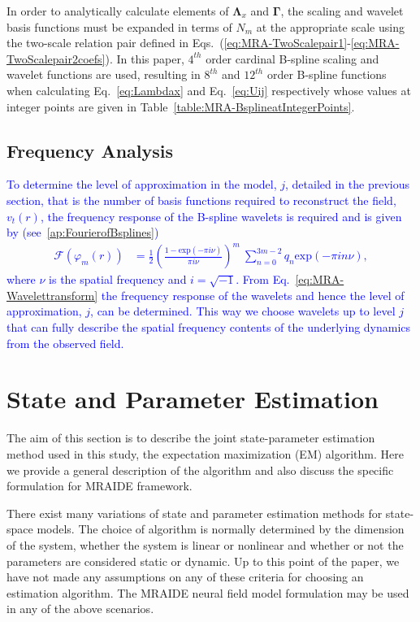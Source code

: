 \documentclass[review,authoryear,3p]{elsarticle}
\newcommand{\parham}[1]{\textcolor{blue}{#1}}
\begin{document}
In order to analytically calculate elements of $\boldsymbol\Lambda_{x}$ and $\boldsymbol\Gamma$, the scaling and wavelet basis functions must be expanded in terms of $N_m$ at the appropriate scale using the two-scale relation pair defined in Eqs.~(\eqref{eq:MRA-TwoScalepair1}-\eqref{eq:MRA-TwoScalepair2coefs}). 
In this paper, $4^{th}$ order cardinal B-spline scaling and wavelet functions are used, resulting in  $8^{th}$ and $12^{th}$ order B-spline functions when calculating Eq.~\eqref{eq:Lambdax} and Eq.~\eqref{eq:Uij} respectively  whose values at integer points are given in Table~\ref{table:MRA-BsplineatIntegerPoints}.
\subsection{Frequency Analysis}\label{sec:freq_anal}
\parham{To determine the level of approximation in the model, $j$, detailed in the previous section, that is the number of basis functions required to reconstruct the field, $v_t(r)$, the frequency response of the B-spline wavelets is required and is given by (see~\ref{ap:FourierofBsplines}) 
\begin{align}      
	  \mathcal{F}(\varphi_{m}\left(r\right)) &=\frac{1}{2}\left(\frac{1-\mathrm{exp}(-\pi i \nu)}{\pi i\nu}\right)^m~\sum_{n=0}^{3m-2}  q_n \mathrm{exp}(-\pi in\nu),\label{eq:MRA-Wavelettransform}
\end{align}
where $\nu$ is the spatial frequency and $i=\sqrt{-1}$. From Eq.~\eqref{eq:MRA-Wavelettransform} the frequency response of the wavelets and hence the level of approximation, $j$, can be determined. This way we choose wavelets up to level $j$ that can fully describe the spatial frequency contents of the underlying dynamics from the observed field.}
\section{State and Parameter Estimation}
The aim of this section is to describe the joint state-parameter estimation method used in this study, the expectation maximization (EM) algorithm. Here we provide a general description of the algorithm and also discuss the specific formulation for MRAIDE framework. 

There exist many variations of state and parameter estimation methods for state-space models. The choice of algorithm is normally determined by the dimension of the system, whether the system is linear or nonlinear and whether or not the parameters are considered static or dynamic. Up to this point of the paper, we have not made any assumptions on any of these criteria for choosing an estimation algorithm. The MRAIDE neural field model formulation may be used in any of the above scenarios.
\end{document}
